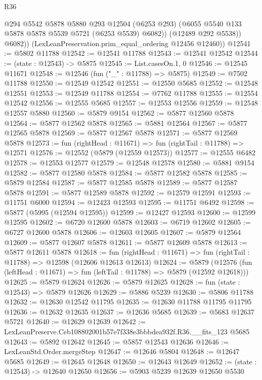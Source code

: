 \begin{lexlean}{R36}
\begin{coremodule}
              @294
              @5542
              @5878
              @5880
              @293
              @12504
              (@6253 @293)
              (@6055 @5540 @133 @5878 @5878 @5539 @5721 (@6253 @5539) @6082))
            (@12489 @292 @5538))
          @6082))
      (LexLeanPreservation.prim_equal_ordering @12456 @12460))
@12541 := @5802 @11788
@12542 := @12541 @11788
@12543 := @12541 @12542
@12544 := (state : @12543) -> @5875
@12545 := List.casesOn.{1, 0}
@12546 := @12545 @11671
@12548 := @12546 (fun ("_" : @11788) => @5875)
@12549 := @7502 @11788
@12550 := @12549 @12542
@12551 := @12550 @5685
@12552 := @12548 @12551
@12553 := @12549 @11788
@12554 := @7762 @11788
@12555 := @12554 @12542
@12556 := @12555 @5685
@12557 := @12553 @12556
@12559 := @12548 @12557 @5880
@12560 := @5879 @9154
@12562 := @5877 @12560 @5878
@12564 := @5877 @12562 @5878
@12565 := @5881 @12564
@12567 := @5877 @12565 @5878
@12569 := @5877 @12567 @5878
@12571 := @5877 @12569 @5878
@12573 := fun (rightHead : @11671) => fun (rightTail : @11788) => @12571
@12576 := @12552 (@5879 (@12559 @12573))
@12577 := @12555 @6482
@12578 := @12553 @12577
@12579 := @12548 @12578
@12580 := @5881 @9154
@12582 := @5877 @12580 @5878
@12584 := @5877 @12582 @5878
@12585 := @5879 @12584
@12587 := @5877 @12585 @5878
@12589 := @5877 @12587 @5878
@12591 := @5877 @12589 @5878
@12592 := @12579 @12591
@12593 := @11751 @6000
@12594 := @12423 @12593
@12595 := @11751 @6492
@12598 := @5877 (@5995 (@12594 @12595))
@12599 := @12427 @12593
@12600 := @12599 @12595
@12602 := @6720 @12600 @5878
@12603 := @6719 @12602
@12605 := @6727 @12600 @5878
@12606 := @12603 @12605
@12607 := @5879 @12564
@12609 := @5877 @12607 @5878
@12611 := @5877 @12609 @5878
@12613 := @5877 @12611 @5878
@12618 := fun (rightHead : @11671) => fun (rightTail : @11788) => @12598 (@12606 @12613 @12613)
@12624 := @5879
    (@12576 (fun (leftHead : @11671) => fun (leftTail : @11788) => @5879 (@12592 @12618)))
@12625 := @5879 @12624
@12626 := @5879 @12625
@12628 := fun (state : @12543) => @5879 @12626
@12629 := @5886 @5239
@12630 := @5806 @11788
@12632 := @12630 @12542 @11795
@12635 := @12630 @11788 @11795 @11795
@12636 := @12632 @12635
@12637 := @12636 @5685
@12639 := @5683 @12637 @5721
@12640 := @12629 @12639
@12642 := LexLeanPreserve.Ceb108802001b57e7f338e3bbbdea932f.R36.__fits_123 @5685
@12643 := @5892 @12642
@12645 := @5857 @12543 @12636
@12646 := LexLeanStd.Order.mergeStep
@12647 := @12646 @5804
@12648 := @12647 @5685
@12649 := @12645 @12648
@12650 := @12643 @12649
@12652 := (state : @12543) -> @12640 @12650
@12656 := @5903 @5239 @12639 @12650 @5530

\end{coremodule}
\end{lexlean}
